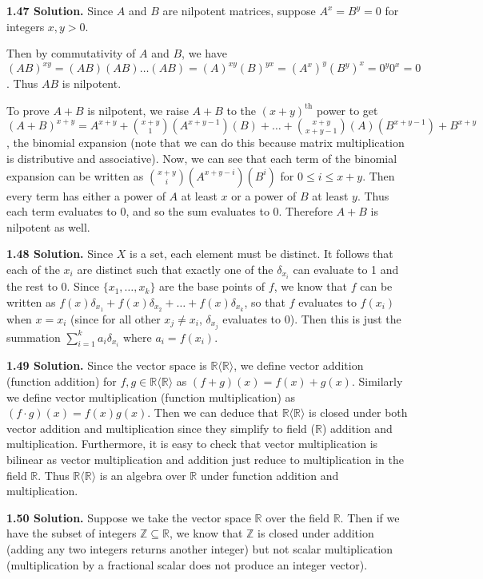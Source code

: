 \textbf{1.47 Solution.} Since $A$ and $B$ are nilpotent matrices, suppose $A^x=B^y=0$ for integers $x,y>0$. 

Then by commutativity of $A$ and $B$, we have $(AB)^{xy}=(AB)(AB)\ldots(AB)=(A)^{xy}(B)^{yx}=(A^x)^y(B^y)^x=0^y0^x=0$. Thus $AB$ is nilpotent.

To prove $A+B$ is nilpotent, we raise $A+B$ to the $(x+y)^{\text{th}}$ power to get $(A+B)^{x+y} = A^{x+y}+\binom{x+y}{1}(A^{x+y-1})(B)+\ldots+ \binom{x+y}{x+y-1}(A)(B^{x+y-1})+B^{x+y}$, the binomial expansion (note that we can do this because matrix multiplication is distributive and associative). Now, we can see that each term of the binomial expansion can be written as $\binom{x+y}{i}(A^{x+y-i})(B^{i})$ for $0\leq i\leq x+y$. Then every term has either a power of $A$ at least $x$ or a power of $B$ at least $y$. Thus each term evaluates to 0, and so the sum evaluates to 0. Therefore $A+B$ is nilpotent as well.

\textbf{1.48 Solution.} Since $X$ is a set, each element must be distinct. It follows that each of the $x_i$ are distinct such that exactly one of the $\delta_{x_i}$ can evaluate to 1 and the rest to 0. Since $\{x_1,\ldots,x_k\}$ are the base points of $f$, we know that $f$ can be written as $f(x)\delta_{x_1} + f(x)\delta_{x_2} + \ldots + f(x)\delta_{x_k}$, so that $f$ evaluates to $f(x_i)$ when $x=x_i$ (since for all other $x_j\neq x_i$, $\delta_{x_j}$ evaluates to 0). Then this is just the summation $\sum_{i=1}^ka_i\delta_{x_i}$ where $a_i=f(x_i)$.

\textbf{1.49 Solution.}  Since the vector space is $\mathbb{R}\langle\mathbb{R}\rangle$, we define vector addition (function addition) for $f,g\in\mathbb{R}\langle\mathbb{R}\rangle$ as $(f+g)(x)=f(x)+g(x)$. Similarly we define vector multiplication (function multiplication) as $(f\cdot g)(x)=f(x)g(x)$. Then we can deduce that $\mathbb{R}\langle\mathbb{R}\rangle$ is closed under both vector addition and multiplication since they simplify to field ($\mathbb{R}$) addition and multiplication. Furthermore, it is easy to check that vector multiplication is bilinear as vector multiplication and addition just reduce to multiplication in the field $\mathbb{R}$. Thus $\mathbb{R}\langle\mathbb{R}\rangle$ is an algebra over $\mathbb{R}$ under function addition and multiplication.

\textbf{1.50 Solution.} Suppose we take the vector space $\mathbb{R}$ over the field $\mathbb{R}$. Then if we have the subset of integers $\mathbb{Z}\subseteq\mathbb{R}$, we know that $\mathbb{Z}$ is closed under addition (adding any two integers returns another integer) but not scalar multiplication (multiplication by a fractional scalar does not produce an integer vector).


